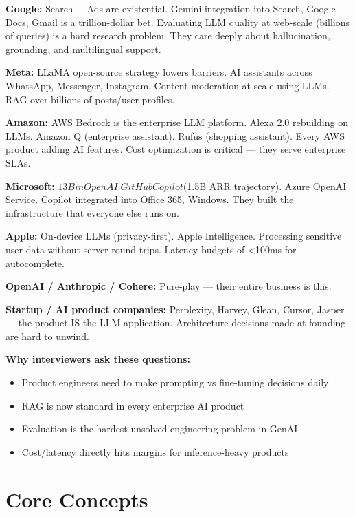 \documentclass[11pt]{article}
\providecommand{\tightlist}{\setlength{\itemsep}{1pt}\setlength{\parskip}{0pt}}
\begin{document}
\textbf{Google:} Search + Ads are existential. Gemini integration into Search, Google Docs, Gmail is a trillion-dollar bet. Evaluating LLM quality at web-scale (billions of queries) is a hard research problem. They care deeply about hallucination, grounding, and multilingual support.

\textbf{Meta:} LLaMA open-source strategy lowers barriers. AI assistants across WhatsApp, Messenger, Instagram. Content moderation at scale using LLMs. RAG over billions of posts/user profiles.

\textbf{Amazon:} AWS Bedrock is the enterprise LLM platform. Alexa 2.0 rebuilding on LLMs. Amazon Q (enterprise assistant). Rufus (shopping assistant). Every AWS product adding AI features. Cost optimization is critical --- they serve enterprise SLAs.

\textbf{Microsoft:} \(13B in OpenAI. GitHub Copilot (\)1.5B ARR trajectory). Azure OpenAI Service. Copilot integrated into Office 365, Windows. They built the infrastructure that everyone else runs on.

\textbf{Apple:} On-device LLMs (privacy-first). Apple Intelligence. Processing sensitive user data without server round-trips. Latency budgets of \textless100ms for autocomplete.

\textbf{OpenAI / Anthropic / Cohere:} Pure-play --- their entire business is this.

\textbf{Startup / AI product companies:} Perplexity, Harvey, Glean, Cursor, Jasper --- the product IS the LLM application. Architecture decisions made at founding are hard to unwind.

\textbf{Why interviewers ask these questions:}

\begin{itemize}
\tightlist
\item
  Product engineers need to make prompting vs fine-tuning decisions daily
\item
  RAG is now standard in every enterprise AI product
\item
  Evaluation is the hardest unsolved engineering problem in GenAI
\item
  Cost/latency directly hits margins for inference-heavy products
\end{itemize}

\section{Core Concepts}\label{core-concepts}
\end{document}
